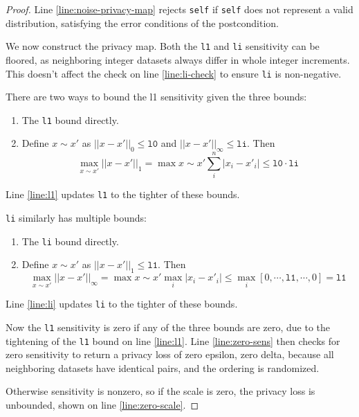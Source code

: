 \documentclass{article}
\begin{document}
\begin{proof}
    Line \ref{line:noise-privacy-map} rejects \texttt{self} if \texttt{self} does not represent a valid distribution,
    satisfying the error conditions of the postcondition.

    We now construct the privacy map.
    Both the \texttt{l1} and \texttt{li} sensitivity can be floored, 
    as neighboring integer datasets always differ in whole integer increments.
    This doesn't affect the check on line \ref{line:li-check} to ensure \texttt{li} is non-negative.
    
    There are two ways to bound the l1 sensitivity given the three bounds:
    \begin{enumerate}
        \item The \texttt{l1} bound directly.
        \item Define $x \sim x'$ as $||x - x'||_0 \leq \texttt{l0}$ and $||x - x'||_\infty \leq \texttt{li}$. Then
        \begin{equation}
            \max_{x \sim x'} ||x - x'||_1 = \max{x \sim x'} \sum^n_i |x_i - x'_i| \leq \texttt{l0} \cdot \texttt{li}
        \end{equation}
    \end{enumerate}
    Line \ref{line:l1} updates \texttt{l1} to the tighter of these bounds.

    \texttt{li} similarly has multiple bounds:
    \begin{enumerate}
        \item The \texttt{li} bound directly.
        \item Define $x \sim x'$ as $||x - x'||_1 \leq \texttt{l1}$. Then
        \begin{equation}
            \max_{x \sim x'} ||x - x'||_\infty = \max{x \sim x'} \max_i |x_i - x'_i| \leq \max_i [0, \cdots, \texttt{l1}, \cdots, 0] = \texttt{l1}
        \end{equation}
    \end{enumerate}
    Line \ref{line:li} updates \texttt{li} to the tighter of these bounds.

    Now the \texttt{l1} sensitivity is zero if any of the three bounds are zero,
    due to the tightening of the \texttt{l1} bound on line \ref{line:l1}.
    Line \ref{line:zero-sens} then checks for zero sensitivity to return a privacy loss of zero epsilon, zero delta, 
    because all neighboring datasets have identical pairs, and the ordering is randomized.

    Otherwise sensitivity is nonzero, so if the scale is zero,
    the privacy loss is unbounded, shown on line \ref{line:zero-scale}.


\end{proof}
\end{document}
